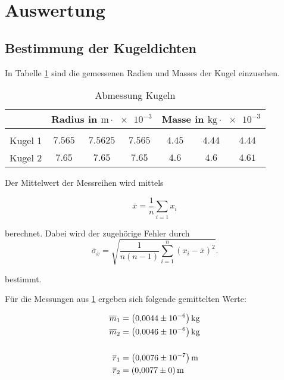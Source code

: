 \section{Auswertung}


\subsection{Bestimmung der Kugeldichten}

In Tabelle \ref{tab:messwerte_kugel} sind die gemessenen Radien und Masses der Kugel 
einzusehen.

\begin{table}
\centering
\begin{tabular} {ccccccc}
	\toprule
  & \multicolumn{3}{c}{Radius in $\si{\meter}\cdot \num{e-3}$}  & \multicolumn{3}{c}{Masse in $\si{\kilogram}\cdot \num{e-3}$} \\
\midrule \\
Kugel 1 & $\num{7.565} $&  $\num{7.5625} $ & $\num{7.565} $  & $\num{4.45}$ & $\num{4.44} $ & $\num{4.44} $ \\
Kugel 2  & $\num{7.65} $&  $\num{7.65} $ & $\num{7.65} $ & $\num{4.6}$ & $\num{4.6} $ & $\num{4.61} $ \\
\bottomrule
\end{tabular}
\caption{Abmessung Kugeln}
\label{tab:messwerte_kugel}

Der Mittelwert der Messreihen wird mittels

\begin{equation}
\label{eq:mittel}
\bar{x}=\frac{1}{n}\sum_{i=1}x_i
\end{equation}

berechnet. Dabei wird der zugehörige Fehler
durch 
\begin{equation}
\label{eq:stand_ab}
\bar{\sigma}_{\bar{x}}=\sqrt{\frac{1}{n(n-1)}\sum_{i=1}^{n}(x_i-\bar{x})^2}.
\end{equation}

bestimmt.

Für die Messungen aus \ref{tab:messwerte_kugel} ergeben sich 
folgende gemittelten Werte:

\begin{align}
\label{eq:abmessungen_kugel}
\begin{aligned}
\overline{m}_{1}&= \left(\num{0.0044}\pm\num{e-6}\right) \si{\kilogram} \\
\overline{m}_{2}&= \left(\num{0.0046}\pm\num{e-6}\right) \si{\kilogram} \\
\hfill \\
\overline{r}_{1}&= \left(\num{0.0076}\pm\num{e-7}\right) \si{\meter} \\
\overline{r}_{2}&= \left(\num{0.0077}\pm\num{0}\right) \si{\meter} \\
\end{aligned}
\end{align}



\end{table}
